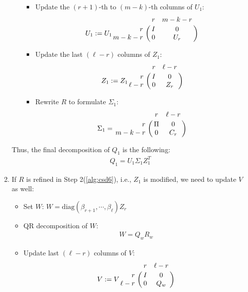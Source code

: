 \begin{enumerate}[Step 2(1).]
\begin{itemize}
\begin{itemize}
\item Update the $(r+1)$-th to $(m-k)$-th columns of $U_{1}$:
    \begin{displaymath}
    U_{1} := U_{1}\bordermatrix{ & r & m-k-r \cr
    \hfill r & I & 0 \cr
    \hfill m-k-r & 0 & U_{r}}
    \end{displaymath}
    
\item Update the last $(\ell-r)$ columns of $Z_{1}$:
    \begin{displaymath}
    Z_{1} := Z_{1}\bordermatrix{ & r & \ell-r \cr
    \hfill r & I & 0 \cr
    \hfill \ell-r & 0 & Z_{r}}
    \end{displaymath}
    
\item Rewrite $R$ to formulate $\Sigma_{1}$:
    \begin{displaymath}
    \Sigma_{1} = \bordermatrix{ & r & \ell-r\cr
    \hfill r & \Pi & 0 \cr
    \hfill m-k-r & 0 & C_{r}}
    \end{displaymath}
\end{itemize}
\end{itemize} 
Thus, the final decomposition of $Q_1$ is the following:
\begin{align}
Q_1 = U_{1}\Sigma_{1}Z_{1}^{T}
\end{align}

\item \label{alg:csd7} 
If $R$ is refined in Step 2(\ref{alg:csd6}), i.e., $Z_{1}$ is modified, 
we need to update $V$ as well:
\begin{itemize}
\item Set $W$: $W = \mbox{diag}(\beta_{r+1}, \cdots, \beta_{\ell})Z_{r}$

\item QR decomposition of $W$:
\begin{align}
W = Q_{w}R_{w}
\end{align}

\item Update last $(\ell-r)$ columns of $V$:
\begin{displaymath}
V := V\bordermatrix{ & r & \ell-r \cr
\hfill r & I & 0 \cr
\hfill \ell-r & 0 & Q_{w}}
\end{displaymath}
\end{itemize}
\end{enumerate}


